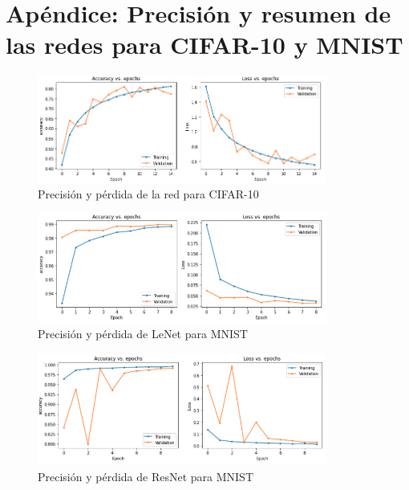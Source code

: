 \section{Apéndice: Precisión y resumen de las redes para CIFAR-10 y MNIST}

\begin{figure}[h!]
    \centering
    \includegraphics[width=0.85\textwidth]{images/model_details/cifar_train.png}
    \caption{Precisión y pérdida de la red para CIFAR-10}
    \label{cifar prec}
\end{figure}

\begin{figure}[h!]
    \centering
    \includegraphics[width=0.85\textwidth]{images/model_details/mnist_linear_good_train.png}
    \caption{Precisión y pérdida de LeNet para MNIST}
    \label{lenet prec}
\end{figure}

\begin{figure}[h!]
    \centering
    \includegraphics[width=0.85\textwidth]{images/model_details/mnist_nonlinear_good_train.png}
    \caption{Precisión y pérdida de ResNet para MNIST}
    \label{resnet prec}
\end{figure}

